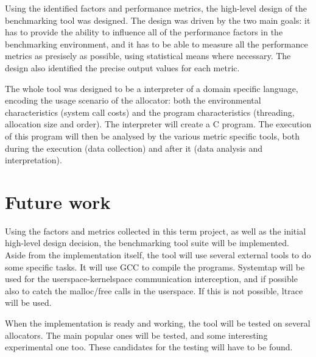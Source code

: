 Using the identified factors and performance metrics, the high-level design of the benchmarking tool was designed. The design was driven by the two main goals: it has to provide the ability to influence all of the performance factors in the benchmarking environment, and it has to be able to measure all the performance metrics as presisely as possible, using statistical means where necessary. The design also identified the precise output values for each metric. 

The whole tool was designed to be a interpreter of a domain specific language, encoding the usage scenario of the allocator: both the environmental characteristics (system call costs) and the program characteristics (threading, allocation size and order). The interpreter will create a C program. The execution of this program will then be analysed by the various metric specific tools, both during the execution (data collection) and after it (data analysis and interpretation).

\section{Future work}

Using the factors and metrics collected in this term project, as well as the initial high-level design decision, the benchmarking tool suite will be implemented. Aside from the implementation itself, the tool will use several external tools to do some specific tasks. It will use GCC to compile the programs. Systemtap will be used for the userspace-kernelspace communication interception, and if possible also to catch the malloc/free calls in the userspace. If this is not possible, ltrace will be used.

When the implementation is ready and working, the tool will be tested on several allocators. The main popular ones will be tested, and some interesting experimental one too. These candidates for the testing will have to be found. 
